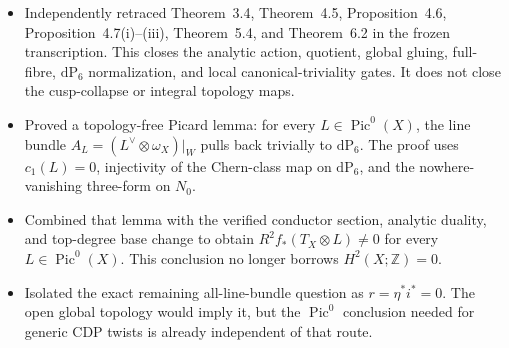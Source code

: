 \begin{itemize}[leftmargin=1.8em]
\item Independently retraced Theorem~3.4, Theorem~4.5,
Proposition~4.6, Proposition~4.7(i)--(iii), Theorem~5.4, and
Theorem~6.2 in the frozen transcription.  This closes the analytic action,
quotient, global gluing, full-fibre, $\mathrm{dP}_6$ normalization, and local
canonical-triviality gates.  It does not close the cusp-collapse or integral
topology maps.
\item Proved a topology-free Picard lemma: for every
$L\in\operatorname{Pic}^0(X)$, the line bundle
$A_L=(L^\vee\otimes\omega_X)|_W$ pulls back trivially to
$\mathrm{dP}_6$.  The proof uses $c_1(L)=0$, injectivity of the Chern-class
map on $\mathrm{dP}_6$, and the nowhere-vanishing three-form on $N_0$.
\item Combined that lemma with the verified conductor section, analytic
duality, and top-degree base change to obtain
$R^2f_*(T_X\otimes L)\ne0$ for every
$L\in\operatorname{Pic}^0(X)$.  This conclusion no longer borrows
$H^2(X;\mathbb Z)=0$.
\item Isolated the exact remaining all-line-bundle question as
$r=\eta^*i^*=0$.  The open global topology would imply it, but the
$\operatorname{Pic}^0$ conclusion needed for generic CDP twists is already
independent of that route.
\end{itemize}
